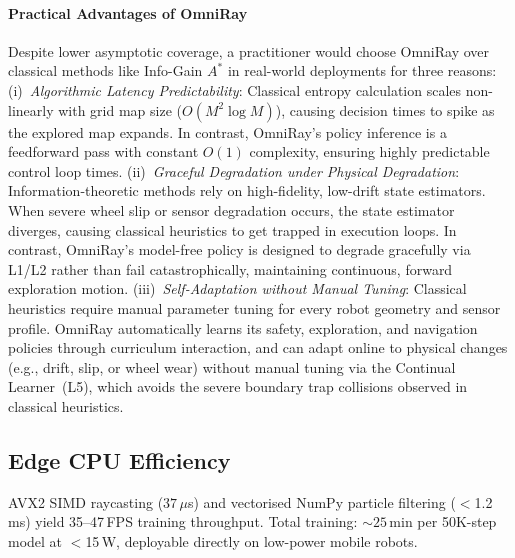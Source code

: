 \documentclass[conference]{IEEEtran}
\begin{document}
\paragraph{Practical Advantages of OmniRay}
Despite lower asymptotic coverage, a practitioner would choose OmniRay over classical methods like Info-Gain $A^*$ in real-world deployments for three reasons:
(i)~\textit{Algorithmic Latency Predictability}: Classical entropy calculation scales non-linearly with grid map size ($O(M^2 \log M)$), causing decision times to spike as the explored map expands. In contrast, OmniRay's policy inference is a feedforward pass with constant $O(1)$ complexity, ensuring highly predictable control loop times.
(ii)~\textit{Graceful Degradation under Physical Degradation}: Information-theoretic methods rely on high-fidelity, low-drift state estimators. When severe wheel slip or sensor degradation occurs, the state estimator diverges, causing classical heuristics to get trapped in execution loops. In contrast, OmniRay's model-free policy is designed to degrade gracefully via L1/L2 rather than fail catastrophically, maintaining continuous, forward exploration motion.
(iii)~\textit{Self-Adaptation without Manual Tuning}: Classical heuristics require manual parameter tuning for every robot geometry and sensor profile. OmniRay automatically learns its safety, exploration, and navigation policies through curriculum interaction, and can adapt online to physical changes (e.g., drift, slip, or wheel wear) without manual tuning via the Continual Learner~(L5), which avoids the severe boundary trap collisions observed in classical heuristics.


\subsection{Edge CPU Efficiency}
AVX2 SIMD raycasting ($37\,\mu$s) and vectorised NumPy particle filtering ($<$1.2\,ms) yield 35--47\,FPS training throughput.
Total training: ${\sim}25$\,min per 50K-step model at $<$15\,W, deployable directly on low-power mobile robots.

\end{document}
